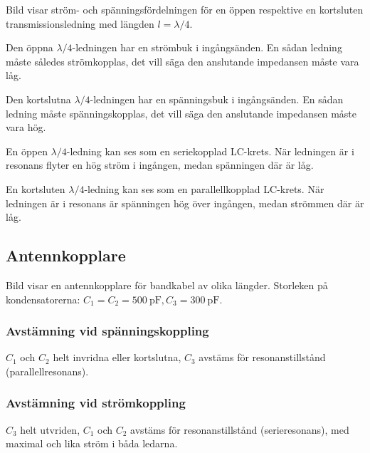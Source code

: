 
Bild  visar ström- och spänningsfördelningen för en öppen
respektive en kortsluten transmissionsledning med längden \(l = \lambda/4\).

Den öppna \(\lambda/4\)-ledningen har en strömbuk i ingångsänden.
En sådan ledning måste således strömkopplas, det vill säga den anslutande
impedansen måste vara låg.

Den kortslutna \(\lambda/4\)-ledningen har en spänningsbuk i ingångsänden.
En sådan ledning måste spänningskopplas, det vill säga den anslutande
impedansen måste vara hög.

En öppen \(\lambda/4\)-ledning kan ses som en seriekopplad LC-krets.
När ledningen är i resonans flyter en hög ström i ingången, medan spänningen
där är låg.

En kortsluten \(\lambda/4\)-ledning kan ses som en parallellkopplad LC-krets.
När ledningen är i resonans är spänningen hög över ingången, medan strömmen där
är låg.


\newpage
\subsection{Antennkopplare}

Bild  visar en antennkopplare för bandkabel av olika
längder.
Storleken på kondensatorerna: \(C_1 = C_2 = \qty{500}{\pico\farad}, C_3 =
\qty{300}{\pico\farad}\).

\subsubsection{Avstämning vid spänningskoppling}

\(C_1\) och \(C_2\) helt invridna eller kortslutna, \(C_3\) avstäms
för resonanstillstånd (parallellresonans).

\subsubsection{Avstämning vid strömkoppling}

\(C_3\) helt utvriden, \(C_1\) och \(C_2\) avstäms för
resonanstillstånd (serieresonans), med maximal och lika ström i båda ledarna.

